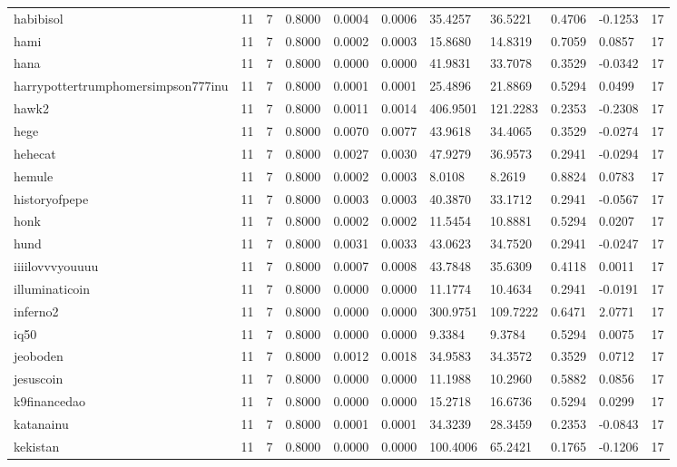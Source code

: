 \begin{table}[htbp]
\begin{tabular}{lllllllllll}
habibisol & 11 & 7 & 0.8000 & 0.0004 & 0.0006 & 35.4257 & 36.5221 & 0.4706 & -0.1253 & 17 \\
hami & 11 & 7 & 0.8000 & 0.0002 & 0.0003 & 15.8680 & 14.8319 & 0.7059 & 0.0857 & 17 \\
hana & 11 & 7 & 0.8000 & 0.0000 & 0.0000 & 41.9831 & 33.7078 & 0.3529 & -0.0342 & 17 \\
harrypottertrumphomersimpson777inu & 11 & 7 & 0.8000 & 0.0001 & 0.0001 & 25.4896 & 21.8869 & 0.5294 & 0.0499 & 17 \\
hawk2 & 11 & 7 & 0.8000 & 0.0011 & 0.0014 & 406.9501 & 121.2283 & 0.2353 & -0.2308 & 17 \\
hege & 11 & 7 & 0.8000 & 0.0070 & 0.0077 & 43.9618 & 34.4065 & 0.3529 & -0.0274 & 17 \\
hehecat & 11 & 7 & 0.8000 & 0.0027 & 0.0030 & 47.9279 & 36.9573 & 0.2941 & -0.0294 & 17 \\
hemule & 11 & 7 & 0.8000 & 0.0002 & 0.0003 & 8.0108 & 8.2619 & 0.8824 & 0.0783 & 17 \\
historyofpepe & 11 & 7 & 0.8000 & 0.0003 & 0.0003 & 40.3870 & 33.1712 & 0.2941 & -0.0567 & 17 \\
honk & 11 & 7 & 0.8000 & 0.0002 & 0.0002 & 11.5454 & 10.8881 & 0.5294 & 0.0207 & 17 \\
hund & 11 & 7 & 0.8000 & 0.0031 & 0.0033 & 43.0623 & 34.7520 & 0.2941 & -0.0247 & 17 \\
iiiilovvvyouuuu & 11 & 7 & 0.8000 & 0.0007 & 0.0008 & 43.7848 & 35.6309 & 0.4118 & 0.0011 & 17 \\
illuminaticoin & 11 & 7 & 0.8000 & 0.0000 & 0.0000 & 11.1774 & 10.4634 & 0.2941 & -0.0191 & 17 \\
inferno2 & 11 & 7 & 0.8000 & 0.0000 & 0.0000 & 300.9751 & 109.7222 & 0.6471 & 2.0771 & 17 \\
iq50 & 11 & 7 & 0.8000 & 0.0000 & 0.0000 & 9.3384 & 9.3784 & 0.5294 & 0.0075 & 17 \\
jeoboden & 11 & 7 & 0.8000 & 0.0012 & 0.0018 & 34.9583 & 34.3572 & 0.3529 & 0.0712 & 17 \\
jesuscoin & 11 & 7 & 0.8000 & 0.0000 & 0.0000 & 11.1988 & 10.2960 & 0.5882 & 0.0856 & 17 \\
k9financedao & 11 & 7 & 0.8000 & 0.0000 & 0.0000 & 15.2718 & 16.6736 & 0.5294 & 0.0299 & 17 \\
katanainu & 11 & 7 & 0.8000 & 0.0001 & 0.0001 & 34.3239 & 28.3459 & 0.2353 & -0.0843 & 17 \\
kekistan & 11 & 7 & 0.8000 & 0.0000 & 0.0000 & 100.4006 & 65.2421 & 0.1765 & -0.1206 & 17 \\

\end{tabular}
\end{table}
